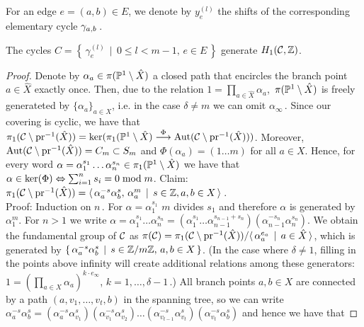 \documentclass[main.tex]{subfiles}
\begin{document}
  For an edge $e = (a,b) \in E$, we denote by $y_e^{(l)}$ the shifts of the corresponding elementary cycle $\cyab$\,.
  
  \begin{thm}\label{thm:gen_set}
   The cycles $C = \left\{ \, \gamma_{e}^{(l)} \, \mid \, 0 \le l <m-1, \, e \in E \, \right\}$ generate $\homo$.
  \end{thm}
  \begin{proof}
  Denote by $\alpha_a \in \pi(\P^1 \setminus \hat{X})$ a closed path that encircles the branch point $a \in \hat{X}$ exactly once. Then,  due to the relation $1 = \prod_{a \in \hat{X}} \alpha_a$,\,
  $\pi(\P^1 \setminus \hat{X})$ is freely generateted by $\{ \alpha_a \}_{a \in X}$, i.e. in the case $\delta \ne m$ we can omit $\alpha_{\infty}$\,. \abstand
  Since our covering is cyclic, we have that $
  \pi_1(\cu \setminus \pr^{-1}(\hat{X})) = \ker(\pi_1(\P^1 \setminus \hat{X}) \overset{\Phi}{\To} \Aut(\cu \setminus \pr^{-1}(\hat{X})))$. Moreover, $\Aut(\cu \setminus \pr^{-1}(\hat{X})) = C_m 
  \subset S_m$
  and $\Phi(\alpha_a) = (1 \dots m)$ for all $a \in X$. Hence, for every word $\alpha = \alpha_1^{s_1}\dots \alpha_n^{s_n} \in \pi_1(\P^1 \setminus \hat{X})$ we have that
  $\alpha \in \ker(\Phi) \eq \sum_{i=1}^n s_i = 0 \bmod m$. \abstand
  Claim: $\pi_1(\cu \setminus \pr^{-1}(\hat{X})) = \langle \, \alpha_a^{-s} \alpha_b^{s}, \, \alpha_a^m  \, \mid \, s \in \Z, a,b \in X \, \rangle$\,. \\
  Proof: Induction on $n$\,. For $\alpha = \alpha_1^{s_1}$ $m$ divides $s_1$ and therefore $\alpha$ is generated by $\alpha_1^m$. For $n > 1$ we write
  $\alpha = \alpha_1^{s_1}\dots \alpha_n^{s_n} = (\alpha_1^{s_1} \dots \alpha_{n-1}^{s_{n-1}+s_n})(\alpha_{n-1}^{-s_n}\alpha_n^{s_n})$. \abstand
  We obtain the fundamental group of $\cu$ as
  $\pi(\cu) = \pi_1(\cu \setminus \pr^{-1}(\hat{X})) / \langle \, \alpha_a^{e_a} \, \mid \, a \in \hat{X} \, \rangle$, which is generated by 
  $\{ \, \alpha_a^{-s} \alpha_b^{s} \, \mid \, s \in \Z/m\Z, \, a,b \in X \, \}$. (In the case where $\delta \ne 1$, filling in the points above infinity will create additional relations among 
  these generators:
  $1 = (\prod_{a \in X} \alpha_a)^{k \cdot e_{\infty}}$, $k = 1,\dots,\delta-1$\,.) \abstand
  All branch points $a,b \in X$ are connected by a path $(a,v_1,\dots,v_t,b)$ in the spanning tree, so we can write $\alpha_a^{-s} \alpha_b^{s} = (\alpha_a^{-s}\alpha_{v_1}^{s})
  (\alpha_{v_1}^{-s}\alpha_{v_2}^{s})\dots(\alpha_{v_{t-1}}^{-s}\alpha_{v_t}^{s})(\alpha_{v_t}^{-s}\alpha_b^{s})$ and hence we have that 

\end{proof}
\end{document}
